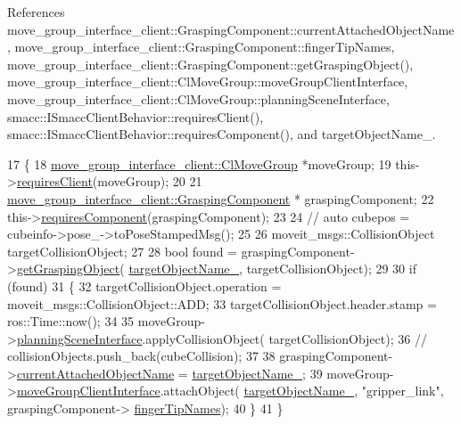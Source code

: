 References move\+\_\+group\+\_\+interface\+\_\+client\+::\+Grasping\+Component\+::current\+Attached\+Object\+Name, move\+\_\+group\+\_\+interface\+\_\+client\+::\+Grasping\+Component\+::finger\+Tip\+Names, move\+\_\+group\+\_\+interface\+\_\+client\+::\+Grasping\+Component\+::get\+Grasping\+Object(), move\+\_\+group\+\_\+interface\+\_\+client\+::\+Cl\+Move\+Group\+::move\+Group\+Client\+Interface, move\+\_\+group\+\_\+interface\+\_\+client\+::\+Cl\+Move\+Group\+::planning\+Scene\+Interface, smacc\+::\+I\+Smacc\+Client\+Behavior\+::requires\+Client(), smacc\+::\+I\+Smacc\+Client\+Behavior\+::requires\+Component(), and target\+Object\+Name\+\_\+.


\begin{DoxyCode}
17     \{
18         \hyperlink{classmove__group__interface__client_1_1ClMoveGroup}{move\_group\_interface\_client::ClMoveGroup} *moveGroup;
19         this->\hyperlink{classsmacc_1_1ISmaccClientBehavior_a32b16e99e3b4cb289414203dc861a440}{requiresClient}(moveGroup);
20 
21         \hyperlink{classmove__group__interface__client_1_1GraspingComponent}{move\_group\_interface\_client::GraspingComponent} *
      graspingComponent;
22         this->\hyperlink{classsmacc_1_1ISmaccClientBehavior_a19c6d658c8e809bb93bfdc9b639a3ac3}{requiresComponent}(graspingComponent);
23 
24         \textcolor{comment}{// auto cubepos = cubeinfo->pose\_->toPoseStampedMsg();}
25 
26         moveit\_msgs::CollisionObject targetCollisionObject;
27 
28         \textcolor{keywordtype}{bool} found = graspingComponent->\hyperlink{classmove__group__interface__client_1_1GraspingComponent_ad3b8583ead160cf3fca89809c9880f1e}{getGraspingObject}(
      \hyperlink{classmove__group__interface__client_1_1CbAttachObject_a3d2591373f673a8479025044138bd82b}{targetObjectName\_}, targetCollisionObject);
29 
30         \textcolor{keywordflow}{if} (found)
31         \{
32             targetCollisionObject.operation = moveit\_msgs::CollisionObject::ADD;
33             targetCollisionObject.header.stamp = ros::Time::now();
34 
35             moveGroup->\hyperlink{classmove__group__interface__client_1_1ClMoveGroup_a401213ca52233581d2a659dbb772720c}{planningSceneInterface}.applyCollisionObject(
      targetCollisionObject);
36             \textcolor{comment}{// collisionObjects.push\_back(cubeCollision);}
37 
38             graspingComponent->\hyperlink{classmove__group__interface__client_1_1GraspingComponent_aa1098467cb6a739228c3ed1a3f66c095}{currentAttachedObjectName} = 
      \hyperlink{classmove__group__interface__client_1_1CbAttachObject_a3d2591373f673a8479025044138bd82b}{targetObjectName\_};
39             moveGroup->\hyperlink{classmove__group__interface__client_1_1ClMoveGroup_a5f0ea9b52695661b17605691168d1f31}{moveGroupClientInterface}.attachObject(
      \hyperlink{classmove__group__interface__client_1_1CbAttachObject_a3d2591373f673a8479025044138bd82b}{targetObjectName\_}, \textcolor{stringliteral}{"gripper\_link"}, graspingComponent->
      \hyperlink{classmove__group__interface__client_1_1GraspingComponent_a31afa10c937b168174e02d322a300c4d}{fingerTipNames});
40         \}
41     \}
\end{DoxyCode}
